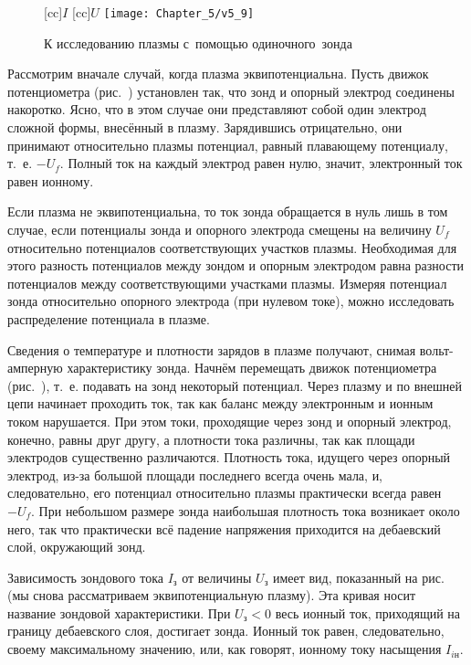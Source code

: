 \begin{figure}[h!]
	\centering
	[cc]{$I$}
	[cc]{$U$}
	\texttt{[image: Chapter\_5/v5\_9]}
	\caption{К исследованию плазмы с~помощью одиночного~зонда}
\end{figure}

Рассмотрим вначале случай, когда плазма эквипотенциальна. Пусть движок потенциометра (рис.~) установлен так, что зонд и
опорный электрод соединены накоротко. Ясно, что в этом случае они представляют собой один электрод сложной формы,
внесённый в плазму.
Зарядившись отрицательно, они принимают относительно плазмы потенциал, равный плавающему потенциалу,
т.~е. $-U_f$. Полный ток на каждый электрод равен нулю, значит, электронный ток равен ионному.

Если плазма не эквипотенциальна, то ток зонда обращается в нуль лишь в том случае, если потенциалы зонда и опорного
электрода смещены на величину $U_f$ относительно потенциалов соответствующих участков плазмы. Необходимая для этого
разность потенциалов между зондом и опорным электродом равна разности потенциалов между соответствующими участками
плазмы. Измеряя потенциал зонда относительно опорного электрода (при нулевом токе), можно исследовать распределение
потенциала в плазме.

Сведения о температуре и плотности зарядов в плазме получают, снимая вольт-амперную характеристику зонда. Начнём
перемещать движок потенциометра (рис.~), т.~е. подавать на зонд некоторый потенциал. Через плазму и по внешней цепи
начинает проходить ток, так как баланс между электронным и ионным током нарушается. При этом
токи, проходящие через зонд и опорный электрод, конечно, равны друг другу, а плотности тока различны, так как площади
электродов существенно различаются. Плотность тока, идущего через опорный электрод, из-за большой площади последнего
всегда очень мала, и, следовательно, его потенциал относительно плазмы практически всегда равен $-U_f$. При небольшом
размере зонда наибольшая плотность тока возникает около него, так что практически всё падение напряжения приходится на
дебаевский слой, окружающий зонд.

Зависимость зондового тока $I_\text{з}$ от величины $U_\text{з}$ имеет вид, показанный на рис.~ (мы снова рассматриваем
эквипотенциальную плазму). Эта кривая носит название зондовой характеристики. При $U_\text{з}<0$ весь ионный ток, приходящий на
границу дебаевского слоя, достигает зонда. Ионный ток равен, следовательно, своему максимальному значению, или, как
говорят, ионному току насыщения $I_{i\text{н}}$. 

